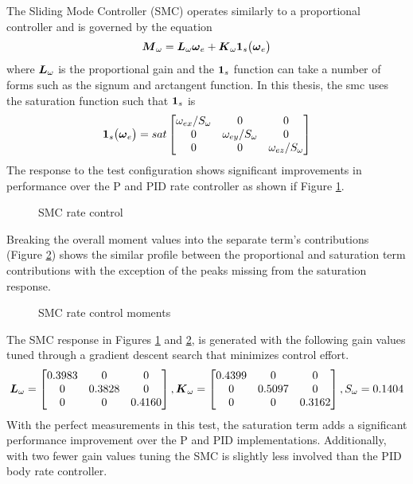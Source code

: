 The Sliding Mode Controller (SMC) operates similarly to a proportional controller and is governed by the equation
\begin{equation}
  \boldsymbol{M}_{\omega} = \boldsymbol{L}_{\omega} \boldsymbol{\omega}_e + \boldsymbol{K}_{\omega}\boldsymbol{1}_s \big(\boldsymbol{\omega}_e \big)
  \label{eqn:SMController}
\end{equation}
where $\boldsymbol{L}_{\omega}$ is the proportional gain and the $\boldsymbol{1}_s$ function can take a number of forms such as the signum and arctangent function.  In this thesis, the smc uses the saturation function such that $\boldsymbol{1}_s$ is
\begin{equation}
  \boldsymbol{1}_s \big(\boldsymbol{\omega}_e \big) = sat \begin{bmatrix} \omega_{ex} / S_{\omega} &0 &0 \\ 0 & \omega_{ey} / S_{\omega} & 0 \\ 0 & 0 & \omega_{ez} / S_{\omega} \end{bmatrix}
\end{equation}
The response to the test configuration shows significant improvements in performance over the P and PID rate controller as shown if Figure \ref{fig:SMCRateControl}.
\begin{figure}[H]
  \centerline{}
  \caption{SMC rate control}
  \label{fig:SMCRateControl}
\end{figure}
Breaking the overall moment values into the separate term's contributions (Figure \ref{fig:SMCRateControlMoments}) shows the similar profile between the proportional and saturation term contributions with the exception of the peaks missing from the saturation response.
\begin{figure}[H]
  \centerline{}
  \caption{SMC rate control moments}
  \label{fig:SMCRateControlMoments}
\end{figure}
The SMC response in Figures \ref{fig:SMCRateControl} and \ref{fig:SMCRateControlMoments}, is generated with the following gain values tuned through a gradient descent search that minimizes control effort.
\begin{equation}
    \boldsymbol{L}_{\omega} = \begin{bmatrix} 0.3983 & 0 & 0 \\ 0 & 0.3828 & 0 \\ 0 & 0 & 0.4160 \end{bmatrix},
    \boldsymbol{K}_{\omega} = \begin{bmatrix} 0.4399 & 0 & 0 \\ 0 & 0.5097 & 0 \\ 0 & 0 & 0.3162 \end{bmatrix},
    S_{\omega} = 0.1404
  \label{SMCRateControlGains}
\end{equation}
With the perfect measurements in this test, the saturation term adds a significant performance improvement over the P and PID implementations.  Additionally, with two fewer gain values tuning the SMC is slightly less involved than the PID body rate controller.

